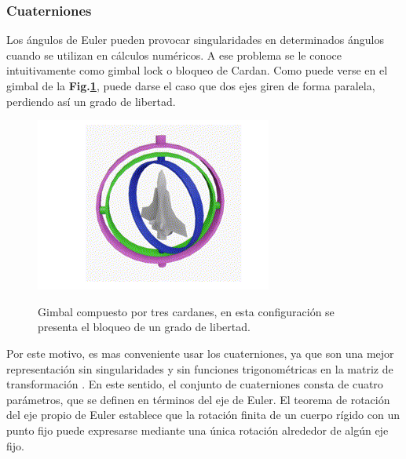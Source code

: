 \subsubsection{Cuaterniones}
\hfill \break
Los ángulos de Euler pueden provocar singularidades en determinados ángulos cuando se utilizan en cálculos numéricos. A ese problema se le conoce intuitivamente como gimbal lock o bloqueo de Cardan. Como puede verse en el gimbal de la \textbf{Fig.\ref{fig:gimbal}}, puede darse el caso que dos ejes giren de forma paralela, perdiendo así un grado de libertad.

\begin{figure}[!ht]
	\begin{center}
		\includegraphics[scale=0.8]{imagenes/marco_teorico/gimbal.PNG}\\
	\end{center}
	\caption{ Gimbal compuesto por tres cardanes, en esta configuración se presenta el bloqueo de un grado de libertad. }
	\label{fig:gimbal}
\end{figure}

Por este motivo, es mas conveniente usar los cuaterniones, ya que son una mejor representación sin singularidades y sin funciones trigonométricas en la matriz de transformación \cite{wertz1978spacecraft}. En este sentido, el conjunto de cuaterniones consta de cuatro parámetros, que se definen en términos del eje de Euler. El teorema de rotación del eje propio de Euler establece que la rotación finita de un cuerpo rígido con un punto fijo puede expresarse mediante una única rotación alrededor de algún eje fijo.

